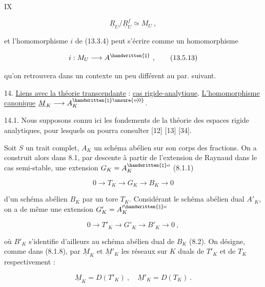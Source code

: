 

IX

\[
 \underline R_U/\underline R_U^f \simeq M_U \ , \tag*{(13.5.12)}
\]

et l'homomorphisme $i$ de (13.3.4) peut s'écrire comme un homomorphisme

\[
 i:M_U\longrightarrow A^{\handwritten{\natural}}\ , \tag*{(13.5.13)}
\]

qu'on retrouvera dans un contexte un peu différent au par. suivant.

14. \uline{Liens avec la théorie transcendante} : \uline{cas rigide-analytique}. \uline{L'homomorphisme canonique} $\underline M_K\longrightarrow A_K^{\handwritten{\natural}\unsure{o|0}}$.

14.1. Nous supposons connu ici les fondements de la théorie des espaces rigide analytiques, pour lesquels on pourra consulter [12] [13] [34].

Soit $S$ un trait complet, $A_K$ un schéma abélien sur son corps des fractions. On a construit alors dans 8.1, par descente à partir de l'extension de Raynaud dans le cas semi-stable, une extension $G_K=A_K^{\handwritten{\natural}o}$ (8.1.1)

\[
 0\longrightarrow T_K\longrightarrow G_K\longrightarrow B_K\longrightarrow0 \tag*{(14.1.1)}
\]

d'un schéma abélien $B_K$ par un tore $T_K$. Considérant le schéma abélien dual $A'_K$, on a de même une extension $G'_K=A_K^{\prime\handwritten{\natural}o}$

\[
 0\longrightarrow T'_K\longrightarrow G'_K\longrightarrow B'_K\longrightarrow0\ , \tag*{(14.1.2)}
\]

où $B'_K$ s'identifie d'ailleurs au schéma abélien dual de $B_K$ (8.2). On désigne, comme dans (8.1.8), par $\underline M_K$ et $\underline M'_K$ les réseaux sur $K$ duals de $T'_K$ et de $T_K$ respectivement :

\[
 \underline M_K=D(T'_K)\ ,\quad\underline M'_K=D(T_K)\ . \tag*{(14.1.3)}
\]



